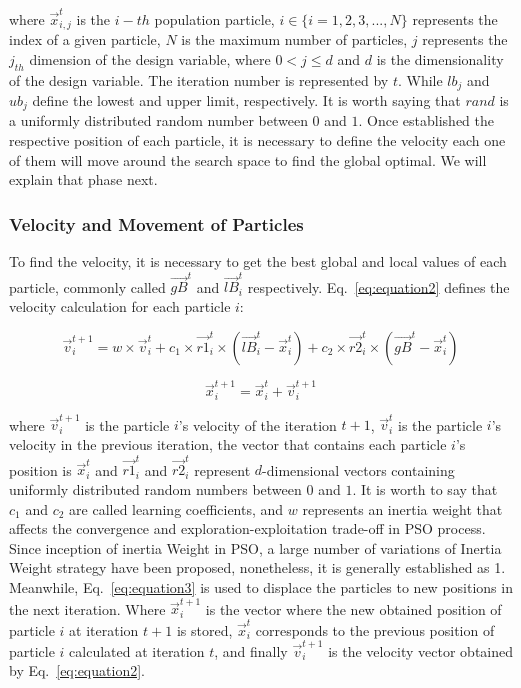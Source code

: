 \noindent where $\vec{x}_{i,j}^t$ is the $i-th$ population particle, $i \in \{i=1,2,3,...,N\}$ represents the index of a given particle, $N$ is the maximum number of particles, $j$ represents the $j_{th}$ dimension of the design variable, where $0<j\leq d$ and $d$ is the dimensionality of the design variable. The iteration number is represented by $t$. While $lb_j$ and $ub_j$ define the lowest and upper limit, respectively. It is worth saying that $rand$ is a uniformly distributed random number between $0$ and $1$. Once established the respective position of each particle, it is necessary to define the velocity each one of them will move around the search space to find the global optimal. We will explain that phase next.

\subsubsection{Velocity and Movement of Particles}

To find the velocity, it is necessary to get the best global and local values of each particle, commonly called $\vec{gB}^t$ and $\vec{lB}_i^t$ respectively. Eq.~\ref{eq:equation2} defines the velocity calculation for each particle $i$:

\begin{equation}
\vec{v}_i^{t+1}=w \times \vec{v}_i^{t}+c_{1} \times \vec{r1}_i^t \times (\vec{lB}_i^t-\vec{x}^{t}_i)+c_{2} \times \vec{r2}_i^t \times (\vec{gB}^t-\vec{x}^{t}_i)
\label{eq:equation2}
\end{equation}

\begin{equation}
\vec{x}_i^{t+1}=\vec{x}_i^{t}+\vec{v}_i^{t+1}
\label{eq:equation3}
\end{equation}

\noindent where $\vec{v}_i^{t+1}$ is the particle $i$'s velocity of the iteration $t+1$, $\vec{v}_i^{t}$ is the particle $i$'s velocity in the previous iteration, the vector that contains each particle $i$'s position is $\vec{x}_i^{t}$ and $\vec{r1}_i^t$ and $\vec{r2}_i^t$ represent $d$-dimensional vectors containing uniformly distributed random numbers between $0$ and $1$. It is worth to say that $c_{1}$ and $c_{2}$ are called learning coefficients, and $w$ represents an inertia weight that affects the convergence and exploration-exploitation trade-off in PSO process. Since inception of inertia Weight in PSO, a large number of variations of Inertia Weight strategy have been proposed, nonetheless, it is generally established as 1. Meanwhile, Eq.~\ref{eq:equation3} is used to displace the particles to new positions in the next iteration. Where $\vec{x}_i^{t+1}$ is the vector where the new obtained position of particle $i$ at iteration $t+1$ is stored, $\vec{x}_i^{t}$ corresponds to the previous position of particle $i$ calculated at iteration $t$, and finally $\vec{v}_i^{t+1}$ is the velocity vector obtained by Eq.~\ref{eq:equation2}.

